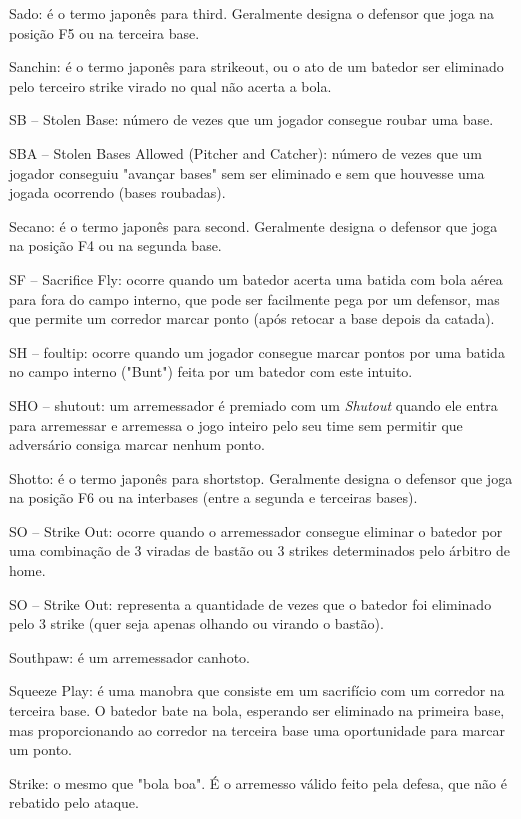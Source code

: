 Sado: é o termo japonês para \gls{third}. Geralmente designa o defensor que joga na posição F5 ou na terceira base.

Sanchin: é o termo japonês para \gls{strikeout}, ou o ato de um batedor ser eliminado pelo terceiro strike virado no qual não acerta a bola.

SB -- Stolen Base: número de vezes que um jogador consegue roubar uma base.

SBA -- Stolen Bases Allowed (Pitcher and Catcher): número de vezes que um jogador conseguiu "avançar bases" sem ser eliminado e sem que houvesse uma
jogada ocorrendo (bases roubadas).

Secano: é o termo japonês para \gls{second}. Geralmente designa o defensor que joga na posição F4 ou na segunda base.

SF -- Sacrifice Fly: ocorre quando um batedor acerta uma batida com bola aérea para fora do campo interno, que pode ser facilmente pega por um defensor, mas que permite um corredor marcar ponto (após retocar a base depois da catada).

SH -- \gls{foultip}: ocorre quando um jogador consegue marcar pontos por uma batida no campo interno ("Bunt") feita por um batedor com este intuito.

SHO -- \gls{shutout}: um arremessador é premiado com um \textit{Shutout} quando ele entra para arremessar e arremessa o jogo inteiro pelo seu time sem permitir que
adversário consiga marcar nenhum ponto.

Shotto: é o termo japonês para \gls{shortstop}. Geralmente designa o defensor que joga na posição F6 ou na interbases (entre a segunda e terceiras bases).

SO -- Strike Out: ocorre quando o arremessador consegue eliminar o batedor por uma combinação de 3 viradas de bastão ou 3 strikes determinados pelo árbitro de \gls{home}.

SO -- Strike Out: representa a quantidade de vezes que o batedor foi eliminado pelo 3 strike (quer seja apenas olhando ou virando o bastão).

Southpaw: é um arremessador canhoto.

Squeeze Play: é uma manobra que consiste em um sacrifício com um corredor na terceira base. O batedor bate na bola, esperando ser eliminado na primeira base, mas proporcionando ao corredor na terceira base uma oportunidade para marcar um ponto.

Strike: o mesmo que "bola boa". É o arremesso válido feito pela defesa, que não é rebatido pelo ataque.


